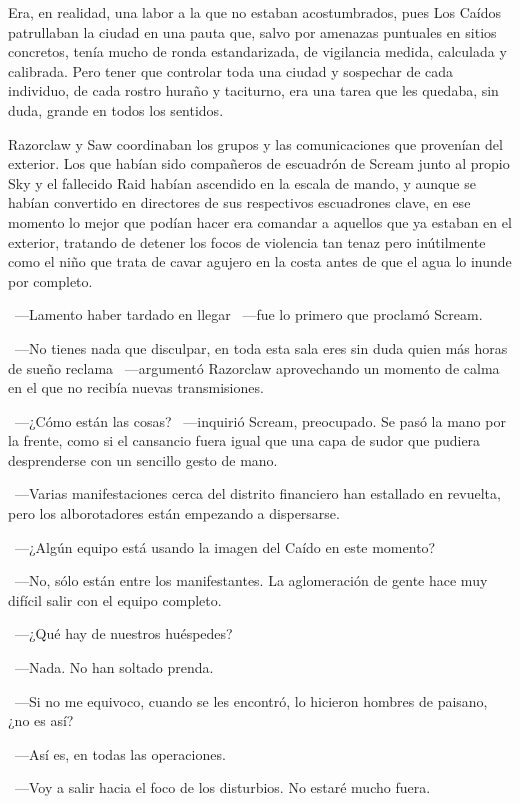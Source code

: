 Era, en realidad, una labor a la que no estaban acostumbrados, pues Los Caídos patrullaban la ciudad en una pauta que, salvo por amenazas puntuales en sitios concretos, tenía mucho de ronda estandarizada, de vigilancia medida, calculada y calibrada. Pero tener que controlar toda una ciudad y sospechar de cada individuo, de cada rostro huraño y taciturno, era una tarea que les quedaba, sin duda, grande en todos los sentidos.

Razorclaw y Saw coordinaban los grupos y las comunicaciones que provenían del exterior. Los que habían sido compañeros de escuadrón de Scream junto al propio Sky y el fallecido Raid habían ascendido en la escala de mando, y aunque se habían convertido en directores de sus respectivos escuadrones clave, en ese momento lo mejor que podían hacer era comandar a aquellos que ya estaban en el exterior, tratando de detener los focos de violencia tan tenaz pero inútilmente como el niño que trata de cavar  agujero en la costa antes de que el agua lo inunde por completo.

~---Lamento haber tardado en llegar ~---fue lo primero que proclamó Scream.

~---No tienes nada que disculpar, en toda esta sala eres sin duda quien más horas de sueño reclama ~---argumentó Razorclaw aprovechando un momento de calma en el que no recibía nuevas transmisiones.

~---¿Cómo están las cosas? ~---inquirió Scream, preocupado. Se pasó la mano por la frente, como si el cansancio fuera igual que una capa de sudor que pudiera desprenderse con un sencillo gesto de mano.

~---Varias manifestaciones cerca del distrito financiero han estallado en revuelta, pero los alborotadores están empezando a dispersarse.

~---¿Algún equipo está usando la imagen del Caído en este momento?

~---No, sólo están entre los manifestantes. La aglomeración de gente hace muy difícil salir con el equipo completo.

~---¿Qué hay de nuestros huéspedes?

~---Nada. No han soltado prenda.

~---Si no me equivoco, cuando se les encontró, lo hicieron hombres de paisano, ¿no es así?

~---Así es, en todas las operaciones.

~---Voy a salir hacia el foco de los disturbios. No estaré mucho fuera.

